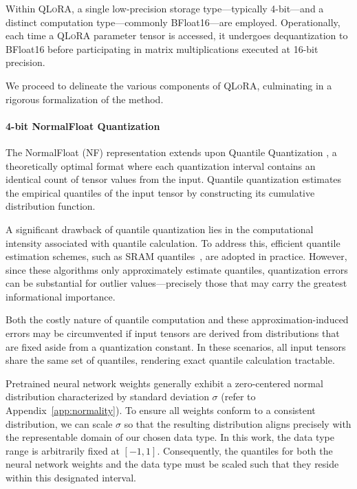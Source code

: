 Within \textsc{QLoRA}, a single low-precision storage type—typically 4-bit—and a distinct computation type—commonly BFloat16—are employed. Operationally, each time a \textsc{QLoRA} parameter tensor is accessed, it undergoes dequantization to BFloat16 before participating in matrix multiplications executed at 16-bit precision.

We proceed to delineate the various components of \textsc{QLoRA}, culminating in a rigorous formalization of the method.

\paragraph{4-bit NormalFloat Quantization} The NormalFloat (NF) representation extends upon Quantile Quantization \citep{dettmers2022optimizers}, a theoretically optimal format where each quantization interval contains an identical count of tensor values from the input. Quantile quantization estimates the empirical quantiles of the input tensor by constructing its cumulative distribution function.

A significant drawback of quantile quantization lies in the computational intensity associated with quantile calculation. To address this, efficient quantile estimation schemes, such as SRAM quantiles~\citep{dettmers2022optimizers}, are adopted in practice. However, since these algorithms only approximately estimate quantiles, quantization errors can be substantial for outlier values—precisely those that may carry the greatest informational importance.

Both the costly nature of quantile computation and these approximation-induced errors may be circumvented if input tensors are derived from distributions that are fixed aside from a quantization constant. In these scenarios, all input tensors share the same set of quantiles, rendering exact quantile calculation tractable.

Pretrained neural network weights generally exhibit a zero-centered normal distribution characterized by standard deviation $\sigma$ (refer to Appendix~\ref{app:normality}). To ensure all weights conform to a consistent distribution, we can scale $\sigma$ so that the resulting distribution aligns precisely with the representable domain of our chosen data type. In this work, the data type range is arbitrarily fixed at $[-1, 1]$. Consequently, the quantiles for both the neural network weights and the data type must be scaled such that they reside within this designated interval.

